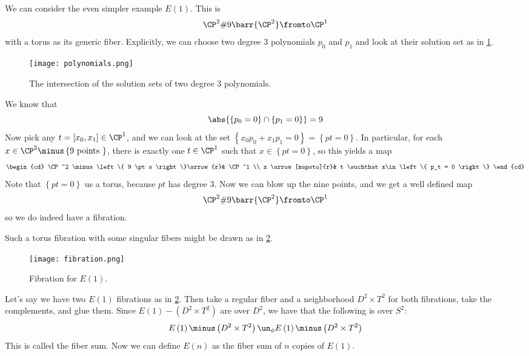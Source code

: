 \documentclass{amsart}
\begin{document}
\begin{exm}
We can consider the even simpler example $E\left( 1 \right)$.
This is
\begin{equation}
\CP^2 \# 9 \barr{\CP^2}
\fromto \CP^1
\end{equation}
with a torus as its generic fiber.
Explicitly, we can choose two degree $3$ polynomials $p_0$ and $p_1$ and look at their solution set 
as in \cref{fig:two_polynomials}.
\begin{figure}
\centering
\texttt{[image: polynomials.png]}
\caption{The intersection of the solution sets of two degree $3$ polynomials.}
\label{fig:two_polynomials}
\end{figure}
We know that 
\begin{equation}
\abs{\left\{ p_0 = 0 \right\} \cap \left\{ p_1 = 0 \right\}} = 9
\end{equation}
Now pick any $t = \left[ x_0 , x_1 \right] \in \CP^1$, and we can look at the set
$\left\{ x_0 p_0 + x_1 p_1 = 0 \right\} = \left\{ pt = 0 \right\}$.
In particular, for each $x\in \CP^2 \minus \left\{ 9 \text{ points } \right\}$, 
there is exactly one $t\in \CP^1$ such that $x\in \left\{ pt = 0 \right\}$, so this yields a map
\begin{equation}
\begin{cd}
\CP^2 \minus \left\{ 9 \pt s \right\}\arrow{r}&
\CP^1 \\
x \arrow[mapsto]{r}&
t \suchthat x\in \left\{ p_t = 0 \right\}
\end{cd}
\end{equation}
Note that $\left\{ pt = 0 \right\}$ us a torus, because $pt$ has degree $3$.
Now we can blow up the nine points, and we get a well defined map
\begin{equation}
\CP^2 \# 9 \barr{\CP^2} \fromto \CP^1
\end{equation}
so we do indeed have a fibration.
\end{exm}

Such a torus fibration with some singular fibers might be drawn 
as in \cref{fig:torus_fibration}.
\begin{figure}
\centering
\texttt{[image: fibration.png]}
\caption{Fibration for $E\left( 1 \right)$.}
\label{fig:torus_fibration}
\end{figure}

\begin{exm}
Let's say we have two $E\left( 1 \right)$ fibrations as in \cref{fig:torus_fibration}.
Then take a regular fiber and a neighborhood $D^2 \times T^2$ for both fibrations, 
take the complements, and glue them.
Since $E\left( 1 \right)\minus \left( D^2 \times T^2 \right)$ are over
$D^2$, we have that the following is over $S^2$:
\begin{equation}
E\left( 1 \right) \minus \left( D^2 \times T^2 \right) 
\un_\phi E\left( 1 \right) \minus \left( D^2 \times T^2 \right) 
\end{equation}
This is called the fiber sum.
Now we can define $E\left( n \right)$ as the fiber sum of $n$ copies of $E\left( 1 \right)$. 
\end{exm}
\end{document}
